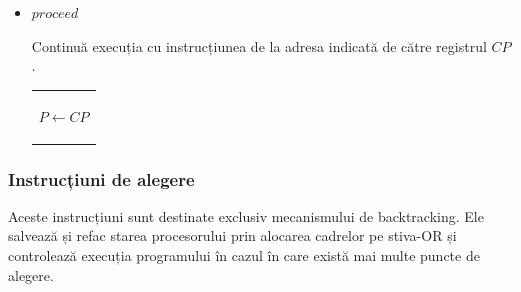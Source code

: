 \documentclass[12pt,a4paper,twoside]{report}
\begin{document}
\begin{itemize}
	\item \(proceed\) \\
	\begin{minipage}{0.45\textwidth}
		   Continuă execuția cu instrucțiunea de la adresa indicată de către registrul $CP$.
	\end{minipage}%
	\hfill
	\begin{minipage}{0.45\textwidth}
	\begin{tabular}{|p{\textwidth}}
	\begin{algorithmic}
		\State $P \gets CP$
	\end{algorithmic}
	\end{tabular}
	\end{minipage}%
\end{itemize}

\subsubsection{Instrucțiuni de alegere}
Aceste instrucțiuni sunt destinate exclusiv mecanismului de backtracking. Ele salvează și refac starea procesorului prin alocarea cadrelor pe stiva-OR și controlează execuția programului în cazul în care există mai multe puncte de alegere. 
\end{document}
